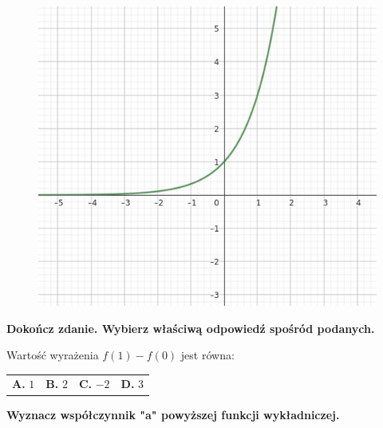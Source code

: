 \documentclass[12pt,a4paper]{article}
\theoremstyle{break}
\begin{document}
	\begin{figure}[h]
		\centering
		\includegraphics[scale=0.7]{r1.jpeg}
	\end{figure}

	
	\begin{zad}[0-1]
		\textbf{Dokończ zdanie. Wybierz właściwą odpowiedź spośród podanych.}
	\end{zad} 
	
	Wartość wyrażenia $f(1)-f(0)$ jest równa:
	
	\vspace{0.5cm}
	\begin{tabular}{p{3.5cm} p{3.5cm} p{3.5cm} p{3.5cm}}
		\textbf{A. }$1$&
		\textbf{B. }$2$&
		\textbf{C. }$-2$&
		\textbf{D. }$3$\\
	\end{tabular}


	\begin{zad}[0-3]
		\textbf{Wyznacz współczynnik "a" powyższej funkcji wykładniczej.}
	\end{zad} 
	
\end{document}
